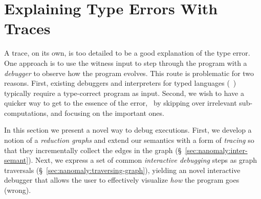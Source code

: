 \section{Explaining Type Errors With Traces}
\label{sec:nanomaly:interactive}

A trace, on its own, is too detailed to be
a good explanation of the type error. One approach
is to use the witness input to step through the
program with a \emph{debugger} to observe how
the program evolves.
%
This route is problematic for two reasons.
%
First, existing debuggers and interpreters for
typed languages (\eg\ \ocaml) typically require
a type-correct program as input.
%
Second, we wish to have a quicker way to get
to the essence of the error, \eg\ by skipping
over irrelevant sub-computations, and focusing
on the important ones.

In this section we present a novel way to debug executions.
%
First, we develop a notion of a \emph{reduction graphs}
and extend our semantics with a form of \emph{tracing}
so that they incrementally collect the edges
in the graph (\S~\ref{sec:nanomaly:inter-semant}).
%
Next, we express a set of common \emph{interactive debugging}
steps as graph traversals (\S~\ref{sec:nanomaly:traversing-graph}), yielding
an novel interactive debugger that allows the user
to effectively visualize \emph{how} the program goes (wrong).

